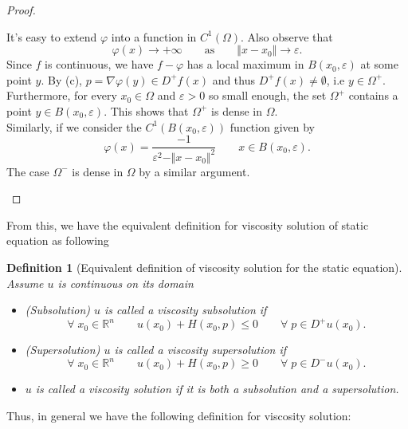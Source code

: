 \documentclass[12pt, oneside]{amsart}  	%
\newtheorem{definition}{Definition}
\begin{document}
\begin{proof}
\begin{itemize}
It's easy to extend $\varphi$ into a function in $C^1(\Omega)$. Also observe that
\begin{equation*}
\varphi(x) \longrightarrow +\infty \qquad\text{as}\qquad \Vert x-x_0\Vert\longrightarrow \varepsilon.
\end{equation*}
Since $f$ is continuous, we have $f-\varphi$ has a local maximum in $B(x_0,\varepsilon)$ at some point $y$. By (c), $p = \nabla \varphi(y)\in D^+f(x)$ and thus $D^+f(x)\neq \emptyset$, i.e $y\in \Omega^+$. Furthermore, for every $x_0\in \Omega$ and $\varepsilon>0$ so small enough, the set $\Omega^+$ contains a point $y\in B(x_0,\varepsilon)$. This shows that $\Omega^+$ is dense in $\Omega$.\\
Similarly, if we consider the $C^1(B(x_0,\varepsilon))$ function given by
\begin{equation*}
\varphi(x) = \frac{-1}{\varepsilon^2 - \Vert x-x_0\Vert^2} \qquad x\in B(x_0,\varepsilon).
\end{equation*}
The case $\Omega^-$ is dense in $\Omega$ by a similar argument.
\end{itemize}
\end{proof}
















From this, we have the equivalent definition for viscosity solution of static equation as following

\begin{definition} [Equivalent definition of viscosity solution for the static equation] Assume $u$ is continuous on its domain
\begin{itemize}
\item (Subsolution) $u$ is called a viscosity subsolution if
$$ \forall\;x_0\in \mathbb{R}^n\qquad  u(x_0) + H(x_0, p)\le 0 \qquad \forall\; p\in D^+u(x_0).$$
\item (Supersolution) $u$ is called a viscosity supersolution if $$ \forall\;x_0\in \mathbb{R}^n\qquad  u(x_0) + H(x_0, p)\ge 0 \qquad \forall\; p\in D^-u(x_0).$$
\item $u$ is called a viscosity solution if it is both a subsolution and a supersolution.
\end{itemize}
\end{definition}

Thus, in general we have the following definition for viscosity solution:
\end{document}
